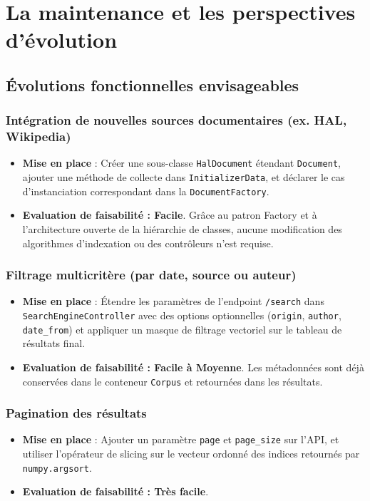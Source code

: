 \documentclass[12pt,a4paper]{article}
\begin{document}
\newpage

\section{La maintenance et les perspectives d'évolution}

\subsection{Évolutions fonctionnelles envisageables}

\subsubsection{Intégration de nouvelles sources documentaires (ex. HAL, Wikipedia)}
\begin{itemize}
    \item \textbf{Mise en place} : Créer une sous-classe \texttt{HalDocument} étendant \texttt{Document}, ajouter une méthode de collecte dans \texttt{InitializerData}, et déclarer le cas d'instanciation correspondant dans la \texttt{DocumentFactory}.
    \item \textbf{Evaluation de faisabilité : Facile}. Grâce au patron Factory et à l'architecture ouverte de la hiérarchie de classes, aucune modification des algorithmes d'indexation ou des contrôleurs n'est requise.
\end{itemize}

\subsubsection{Filtrage multicritère (par date, source ou auteur)}
\begin{itemize}
    \item \textbf{Mise en place} : Étendre les paramètres de l'endpoint \texttt{/search} dans \texttt{SearchEngineController} avec des options optionnelles (\texttt{origin}, \texttt{author}, \texttt{date\_from}) et appliquer un masque de filtrage vectoriel sur le tableau de résultats final.
    \item \textbf{Evaluation de faisabilité : Facile à Moyenne}. Les métadonnées sont déjà conservées dans le conteneur \texttt{Corpus} et retournées dans les résultats.
\end{itemize}

\subsubsection{Pagination des résultats}
\begin{itemize}
    \item \textbf{Mise en place} : Ajouter un paramètre \texttt{page} et \texttt{page\_size} sur l'API, et utiliser l'opérateur de slicing sur le vecteur ordonné des indices retournés par \texttt{numpy.argsort}.
    \item \textbf{Evaluation de faisabilité : Très facile}.
\end{itemize}
\end{document}
